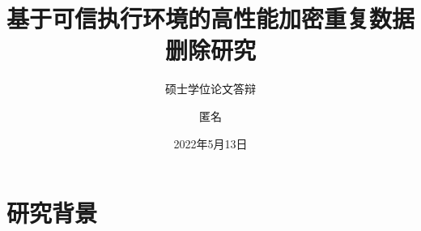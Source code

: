 \documentclass{beamer}
\author{匿名}
\title{基于可信执行环境的高性能加密重复数据删除研究}
\subtitle{硕士学位论文答辩}
\institute{电子科技大学计算机科学与工程学院（网络空间安全学院）}
\date{2022年5月13日}
\begin{document}
\kaishu
\begin{frame}
    \titlepage
\end{frame}



\section{研究背景}

\end{document}
